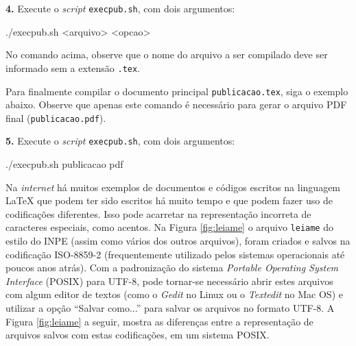 %
%
%
%
%
%
%
%
%
%
%
%
%
%

\textbf{4.} Execute o \textit{script} {\tt execpub.sh}, com dois argumentos:
\begin{meucomando}
./execpub.sh <arquivo> <opcao>
\end{meucomando}

No comando acima, observe que o nome do arquivo a ser compilado deve ser informado sem a extensão {\tt .tex}.

Para finalmente compilar o documento principal {\tt publicacao.tex}, siga o exemplo abaixo. Observe que apenas este comando é necessário para gerar o arquivo PDF final ({\tt publicacao.pdf}).

\textbf{5.} Execute o \textit{script} {\tt execpub.sh}, com dois argumentos:
\begin{meucomando}
./execpub.sh publicacao pdf
\end{meucomando}

Na \textit{internet} há muitos exemplos de documentos e códigos escritos na linguagem \LaTeX{} que podem ter sido escritos há muito tempo e que podem fazer uso de codificações diferentes. Isso pode acarretar na representação incorreta de caracteres especiais, como acentos. Na Figura \ref{fig:leiame} o arquivo {\tt leiame} do estilo do INPE (assim como vários dos outros arquivos), foram criados e salvos na codificação ISO-8859-2 (frequentemente utilizado pelos sistemas operacionais até poucos anos atrás). Com a padronização do sistema \textit{Portable Operating System Interface} (POSIX) para UTF-8, pode tornar-se necessário abrir estes arquivos com algum editor de textos (como o \textit{Gedit} no Linux ou o \textit{Textedit} no Mac OS) e utilizar a opção ``Salvar como...'' para salvar os arquivos no formato UTF-8. A Figura \ref{fig:leiame} a seguir, mostra as diferenças entre a representação de arquivos salvos com estas codificações, em um sistema POSIX. 

